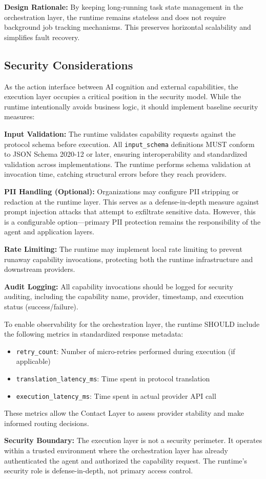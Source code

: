 \textbf{Design Rationale:} By keeping long-running task state management in the orchestration layer, the runtime remains stateless and does not require background job tracking mechanisms. This preserves horizontal scalability and simplifies fault recovery.

\subsection{Security Considerations}

As the action interface between AI cognition and external capabilities, the execution layer occupies a critical position in the security model. While the runtime intentionally avoids business logic, it should implement baseline security measures:

\textbf{Input Validation:} The runtime validates capability requests against the protocol schema before execution. All \texttt{input\_schema} definitions MUST conform to JSON Schema 2020-12 or later, ensuring interoperability and standardized validation across implementations. The runtime performs schema validation at invocation time, catching structural errors before they reach providers.

\textbf{PII Handling (Optional):} Organizations may configure PII stripping or redaction at the runtime layer. This serves as a defense-in-depth measure against prompt injection attacks that attempt to exfiltrate sensitive data. However, this is a configurable option---primary PII protection remains the responsibility of the agent and application layers.

\textbf{Rate Limiting:} The runtime may implement local rate limiting to prevent runaway capability invocations, protecting both the runtime infrastructure and downstream providers.

\textbf{Audit Logging:} All capability invocations should be logged for security auditing, including the capability name, provider, timestamp, and execution status (success/failure).

To enable observability for the orchestration layer, the runtime SHOULD include the following metrics in standardized response metadata:
\begin{itemize}
    \item \texttt{retry\_count}: Number of micro-retries performed during execution (if applicable)
    \item \texttt{translation\_latency\_ms}: Time spent in protocol translation
    \item \texttt{execution\_latency\_ms}: Time spent in actual provider API call
\end{itemize}

These metrics allow the Contact Layer to assess provider stability and make informed routing decisions.

\textbf{Security Boundary:} The execution layer is not a security perimeter. It operates within a trusted environment where the orchestration layer has already authenticated the agent and authorized the capability request. The runtime's security role is defense-in-depth, not primary access control.
